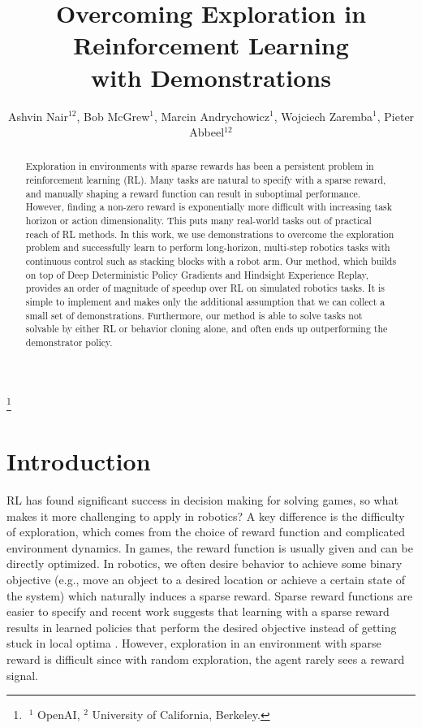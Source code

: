 \documentclass[letterpaper, 10 pt, conference]{ieeeconf}  %
\title{\LARGE \bf
Overcoming Exploration in Reinforcement Learning \\ with Demonstrations
}
\author{Ashvin Nair$^{12}$, Bob McGrew$^{1}$, Marcin Andrychowicz$^{1}$, Wojciech Zaremba$^1$, Pieter Abbeel$^{12}$}
\newcommand\blfootnote[1]{%
  \begingroup
  \renewcommand\thefootnote{}\footnote{#1}%
  \addtocounter{footnote}{-1}%
  \endgroup
}
\begin{document}
\maketitle
\blfootnote{$\;^1$ OpenAI, $^2$ University of California, Berkeley.}

\thispagestyle{empty}
\pagestyle{empty}


\vspace{-10pt}
\begin{abstract}
Exploration in environments with sparse rewards has been a persistent problem in reinforcement learning (RL). Many tasks are natural to specify with a sparse reward, and manually shaping a reward function can result in suboptimal performance. However, finding a non-zero reward is exponentially more difficult with increasing task horizon or action dimensionality. This puts many real-world tasks out of practical reach of RL methods. In this work, we use demonstrations to overcome the exploration problem and successfully learn to perform long-horizon, multi-step robotics tasks with continuous control such as stacking blocks with a robot arm. Our method, which builds on top of Deep Deterministic Policy Gradients and Hindsight Experience Replay, provides an order of magnitude of speedup over RL on simulated robotics tasks. It is simple to implement and makes only the additional assumption that we can collect a small set of demonstrations. Furthermore, our method is able to solve tasks not solvable by either RL or behavior cloning alone, and often ends up outperforming the demonstrator policy.

\end{abstract}


\section{Introduction}

RL has found significant success in decision making for solving games, so what makes it more challenging to apply in robotics? A key difference is the difficulty of exploration, which comes from  the choice of reward function and complicated environment dynamics. In games, the reward function is usually given and can be directly optimized. In robotics, we often desire behavior to achieve some binary objective (e.g., move an object to a desired location or achieve a certain state of the system) which naturally induces a sparse reward. Sparse reward functions are easier to specify and recent work suggests that learning with a sparse reward results in learned policies that perform the desired objective instead of getting stuck in local optima \cite{andrychowicz2017her, vecerik17ddpgfd}. However, exploration in an environment with sparse reward is difficult since with random exploration, the agent rarely sees a reward signal.
\end{document}
